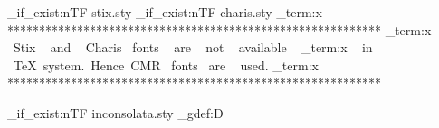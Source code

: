  \let\comma\@empty
\let\tnotesep\@empty
\let\@title\@empty
%
%

\RequirePackage{cas-common}

%
%
\ExplSyntaxOn

\RenewDocumentCommand \maketitle { }
{
    { 
      \setcounter{page}{0}
      \thispagestyle{empty}
      \unvbox\casgrabsbox  
    } { }  
  \pagebreak  
    { 
      \setcounter{page}{0}
      \thispagestyle{empty}
      \unvbox\casauhlbox
    } { }    
  \pagebreak
  \thispagestyle{first}    
  {
    \LongMaketitleBox
    \ProcessLongTitleBox
  }
  {
    \twocolumn[\MaketitleBox]  
    \printFirstPageNotes
  }
  \setcounter{footnote}{\int_use:N \g_stm_fnote_int}
  \renewcommand\thefootnote{\arabic{footnote}}
  \gdef\@pdfauthor{\infoauthors}
  \gdef\@pdfsubject{Complex ~STM ~Content}
}

%
%
\RequirePackage[T1]{fontenc}

\file_if_exist:nTF { stix.sty }
{
  \file_if_exist:nTF { charis.sty }
  {
    \RequirePackage[notext]{stix} 
    \RequirePackage{charis}
  }
  { \RequirePackage{stix} }
}
{
  \iow_term:x {  *********************************************************** }
  \iow_term:x { ~Stix ~ and ~ Charis~ fonts ~ are ~ not ~ available ~ }
  \iow_term:x { ~ in ~TeX~system.~Hence~CMR~ fonts~ are ~ used. }
  \iow_term:x {  *********************************************************** }
}

\file_if_exist:nTF { inconsolata.sty }
{ \RequirePackage[scaled=.85]{inconsolata} }
{ \tex_gdef:D  }


\ExplSyntaxOff

%
%
\usepackage[%
   paperwidth=210mm,
   paperheight=280mm,
   vmargin={19.5mm,18.2mm},
   hmargin={18.1mm,18.1mm},
   headsep=12pt,
   footskip=12pt,
   columnsep=18pt
]{geometry}


\endinput
  
%
%

